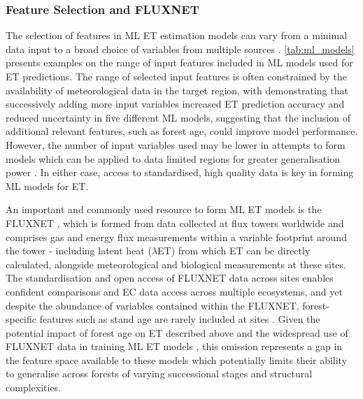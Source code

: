 \subsubsection{Feature Selection and FLUXNET}
The selection of features in ML ET estimation models can vary from a minimal data input \parencite{ahmadi2024solaret} to a broad choice of variables from multiple sources \parencite{liu2021assessment}. \autoref{tab:ml_models} presents examples on the range of input features included in ML models used for ET predictions. The range of selected input features is often constrained by the availability of meteorological data in the target region, with \textcite{xu2018evaluating} demonstrating that successively adding more input variables increased ET prediction accuracy and reduced uncertainty in five different ML models, suggesting that the inclusion of additional relevant features, such as forest age, could improve model performance. However, the number of input variables used may be lower in attempts to form models which can be applied to data limited regions for greater generalisation power \parencite{ahmadi2024solaret}. In either case, access to standardised, high quality data is key in forming ML models for ET.
\par An important and commonly used resource to form ML ET models is the FLUXNET \parencite{baldocchi2001fluxnet, pastorello2020fluxnet2015}, which is formed from data collected at flux towers worldwide and comprises gas and energy flux measurements within a variable footprint around the tower - including latent heat ($\lambda$ET) from which ET can be directly calculated, alongside meteorological and biological measurements at these sites. The standardisation and open access of FLUXNET data across sites enables confident comparisons and EC data access across multiple ecosystems, and yet despite the abundance of variables contained within the FLUXNET, forest-specific features such as stand age are rarely included at sites  \parencite{pastorello2020fluxnet2015}. Given the potential impact of forest age on ET described above and the widespread use of FLUXNET data in training ML ET models \parencite{jung2010recent,besnard2018,wang2022recent}, this omission represents a gap in the feature space available to these models which potentially limits their ability to generalise across forests of varying successional stages and structural complexities.

